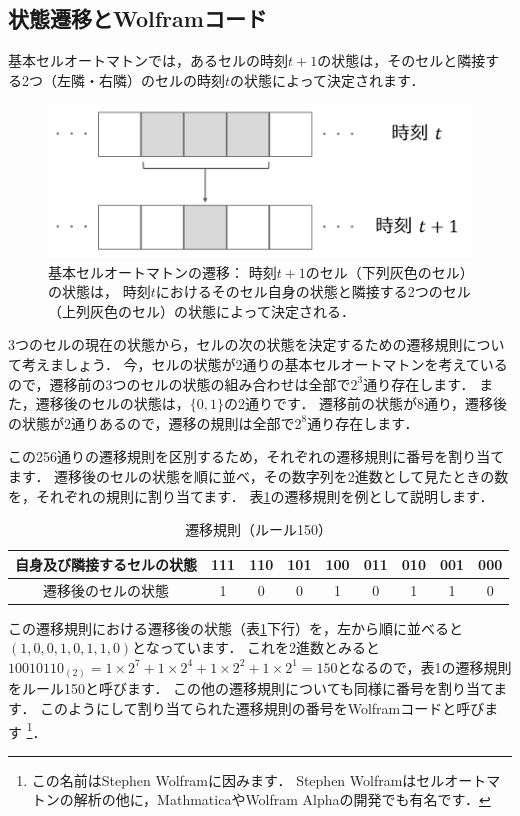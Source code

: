 \documentclass[dvipdfmx]{jsarticle}
\theoremstyle{definition}
\begin{document}
\subsection{状態遷移とWolframコード}  \label{subsec_trans_wcode}
基本セルオートマトンでは，あるセルの時刻$t+1$の状態は，そのセルと隣接する2つ（左隣・右隣）のセルの時刻$t$の状態によって決定されます．
%
\begin{figure}[H]
    \centering
    \includegraphics[scale=0.2]{figure/eca/eca_trans.png}
    \caption{
        基本セルオートマトンの遷移：
        時刻$t+1$のセル（下列灰色のセル）の状態は，
        時刻$t$におけるそのセル自身の状態と隣接する2つのセル（上列灰色のセル）の状態によって決定される．
    }
    \label{pic_eca_trans}
\end{figure}

3つのセルの現在の状態から，セルの次の状態を決定するための遷移規則について考えましょう．
今，セルの状態が2通りの基本セルオートマトンを考えているので，遷移前の3つのセルの状態の組み合わせは全部で$2^3$通り存在します．
また，遷移後のセルの状態は，$\{0,1\}$の2通りです．
遷移前の状態が8通り，遷移後の状態が2通りあるので，遷移の規則は全部で$2^8$通り存在します．

この256通りの遷移規則を区別するため，それぞれの遷移規則に番号を割り当てます．
遷移後のセルの状態を順に並べ，その数字列を2進数として見たときの数を，それぞれの規則に割り当てます．
表\ref{tab_transrule_150}の遷移規則を例として説明します．
%
\begin{table}[H]
    \caption{遷移規則（ルール150）}
    \label{tab_transrule_150}
    \centering
    \begin{tabular}{|c||c|c|c|c|c|c|c|c|} \hline
        自身及び隣接するセルの状態 & 111 & 110 & 101 & 100 & 011 & 010 & 001 & 000 \\ \hline
        遷移後のセルの状態      &  1  &  0  &  0  &  1  &  0  &  1  &  1  &  0  \\ \hline
    \end{tabular}
\end{table}
%
\noindent
この遷移規則における遷移後の状態（表\ref{tab_transrule_150}下行）を，左から順に並べると$(1, 0, 0, 1, 0, 1, 1, 0)$となっています．
これを2進数とみると$10010110_{(2)} = 1\times 2^7 + 1\times 2^4 + 1\times 2^2 + 1\times 2^1 = 150$となるので，表1の遷移規則をルール150と呼びます．
この他の遷移規則についても同様に番号を割り当てます．
このようにして割り当てられた遷移規則の番号をWolframコードと呼びます
\footnote{
    この名前はStephen Wolframに因みます．
    Stephen Wolframはセルオートマトンの解析の他に，MathmaticaやWolfram Alpha\cite{wolalp}の開発でも有名です．
}．
\end{document}
